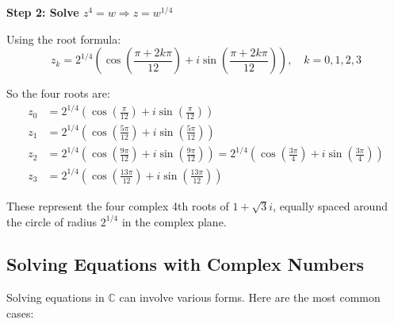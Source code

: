 \textbf{Step 2: Solve \( z^4 = w \Rightarrow z = w^{1/4} \)}

Using the root formula:
\[
z_k = 2^{1/4} \left( \cos\left( \frac{\pi + 2k\pi}{12} \right) + i \sin\left( \frac{\pi + 2k\pi}{12} \right) \right), \quad k = 0, 1, 2, 3
\]

So the four roots are:
\begin{align*}
z_0 &= 2^{1/4} \left( \cos\left( \frac{\pi}{12} \right) + i \sin\left( \frac{\pi}{12} \right) \right) \\
z_1 &= 2^{1/4} \left( \cos\left( \frac{5\pi}{12} \right) + i \sin\left( \frac{5\pi}{12} \right) \right) \\
z_2 &= 2^{1/4} \left( \cos\left( \frac{9\pi}{12} \right) + i \sin\left( \frac{9\pi}{12} \right) \right) = 2^{1/4} \left( \cos\left( \frac{3\pi}{4} \right) + i \sin\left( \frac{3\pi}{4} \right) \right) \\
z_3 &= 2^{1/4} \left( \cos\left( \frac{13\pi}{12} \right) + i \sin\left( \frac{13\pi}{12} \right) \right)
\end{align*}

These represent the four complex 4th roots of \( 1 + \sqrt{3}i \), equally spaced around the circle of radius \( 2^{1/4} \) in the complex plane.

\subsection{Solving Equations with Complex Numbers}

Solving equations in \( \mathbb{C} \) can involve various forms. Here are the most common cases:


